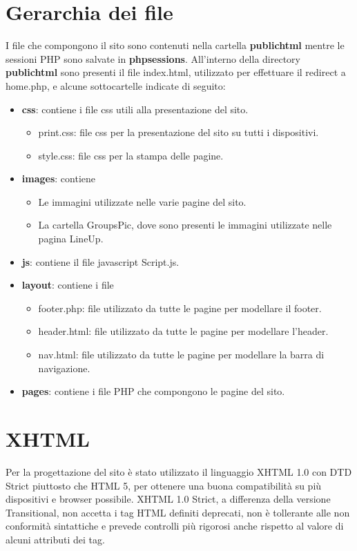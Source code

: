 \documentclass[10pt, a4paper]{article}
\begin{document}
\section{Gerarchia dei file}
I file che compongono il sito sono contenuti nella cartella \textbf{public\textunderscore html} mentre le sessioni PHP sono salvate in \textbf{php\textunderscore sessions}. All'interno della directory \textbf{public\textunderscore html} sono presenti il file index.html, utilizzato per effettuare il redirect a home.php, e alcune sottocartelle indicate di seguito:
\begin{itemize}
  \item{\textbf{css}: contiene i file css utili alla presentazione del sito.}
    \begin{itemize}
      \item{print.css: file css per la presentazione del sito su tutti i dispositivi.}
      \item{style.css: file css per la stampa delle pagine.}
    \end{itemize}
  \item{\textbf{images}: contiene}
    \begin{itemize}
       \item{Le immagini utilizzate nelle varie pagine del sito.}
        \item{La cartella GroupsPic, dove sono presenti le immagini utilizzate nelle pagina LineUp.}
    \end{itemize}
  \item{\textbf{js}: contiene il file javascript Script.js.}
  \item{\textbf{layout}: contiene i file }
    \begin{itemize}
       \item{footer.php: file utilizzato da tutte le pagine per modellare il footer.}
        \item{header.html: file utilizzato da tutte le pagine per modellare l'header.}
        \item{nav.html: file utilizzato da tutte le pagine per modellare la barra di navigazione.}
    \end{itemize}
  \item{\textbf{pages}: contiene i file PHP che compongono le pagine del sito.}
\end{itemize}
\section{XHTML}
Per la progettazione del sito è stato utilizzato il linguaggio XHTML 1.0 con DTD Strict piuttosto che HTML 5, per ottenere una buona compatibilità su più dispositivi e browser possibile.
XHTML 1.0 Strict, a differenza della versione Transitional, non accetta i tag HTML definiti deprecati, non è tollerante alle non conformità sintattiche e prevede controlli più rigorosi anche rispetto al valore di alcuni attributi dei tag.
\end{document}

